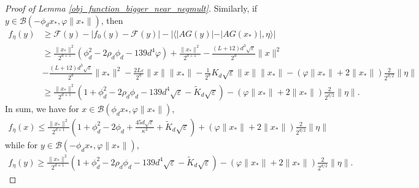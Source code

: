 \documentclass[11pt]{article}
\renewcommand{\epsilon}{\varepsilon}
\newcommand{\G}{G}
\theoremstyle{remark}
\begin{document}
\begin{proof}[Proof of Lemma \ref{obj_function_bigger_near_negmult}]
Similarly, if $y \in \mathcal{B}(-\phi_d x_*,\varphi \|x_*\|)$, then \begin{align*}
    f_{\eta}(y) & \geqslant \mathcal{F}(y) - |f_0(y) - \mathcal{F}(y)| - |\langle |A\G(y)| - |A\G(x_*)|,\eta\rangle|\\ 
    & \geqslant \frac{\|x_*\|^2}{2^{d+1}}(\phi_d^2 - 2\rho_d \phi_d - 139d^4\varphi) + \frac{\|x_*\|^2}{2^{d+1}} - \frac{(L+12)d^3\sqrt{\epsilon}}{2^d}\|x\|^2 \\
    & - \frac{(L+12)d^3\sqrt{\epsilon}}{2^d}\|x_*\|^2 - \frac{2L\epsilon}{2^d}\|x\|\|x_*\| - \frac{1}{2^d}K_d\sqrt{\epsilon}\|x\|\|x_*\|-  (\varphi \|x_*\| + 2\|x_*\|)\frac{2}{2^{d/2}}\|\eta\|\\
    & \geqslant \frac{\|x_*\|^2}{2^{d+1}}(1 + \phi_d^2 - 2\rho_d \phi_d - 139d^4\sqrt{\epsilon} - \tilde{K}_d\sqrt{\epsilon}) - (\varphi \|x_*\| + 2\|x_*\|)\frac{2}{2^{d/2}}\|\eta\|.
\end{align*} In sum, we have for $x \in \mathcal{B}(\phi_d x_*,\varphi\|x_*\|)$, \begin{align}
    f_{\eta}(x) \leqslant \frac{\|x_*\|^2}{2^{d+1}} \left(1 + \phi_d^2 - 2\phi_d + \frac{45d\sqrt{\epsilon}}{\kappa^3} + \tilde{K}_d\sqrt{\epsilon}\right) + (\varphi \|x_*\| + 2\|x_*\|)\frac{2}{2^{d/2}}\|\eta\| \label{lemma5upperbound_quantity}
\end{align} while for $y \in \mathcal{B}(-\phi_d x_*,\varphi\|x_*\|)$, \begin{align}
    f_{\eta}(y) \geqslant \frac{\|x_*\|^2}{2^{d+1}}\left(1 + \phi_d^2 - 2\rho_d \phi_d - 139d^4 \sqrt{\epsilon} - \tilde{K}_d\sqrt{\epsilon}\right)- (\varphi \|x_*\| + 2\|x_*\|)\frac{2}{2^{d/2}}\|\eta\| \label{lemma5lowerbound_quantity}.
\end{align} 


\end{proof}
\end{document}
